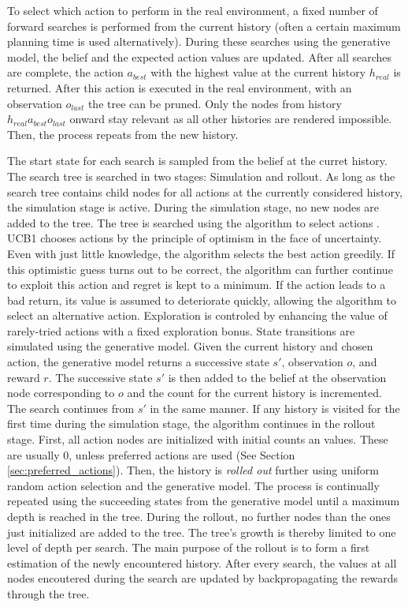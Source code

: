 To select which action to perform in the real environment, a fixed number of forward searches is performed from the current history (often a certain maximum planning time is used alternatively). During these searches using the generative model, the belief and the expected action values are updated. After all searches are complete, the action $a_{best}$ with the highest value at the current history $h_{real}$ is returned. After this action is executed in the real environment, with an observation $o_{last}$ the tree can be pruned. Only the nodes from history $h_{real}a_{best}o_{last}$ onward stay relevant as all other histories are rendered impossible. Then, the process repeats from the new history.

The start state for each search is sampled from the belief at the curret history. The search tree is searched in two stages: Simulation and rollout. As long as the search tree contains child nodes for all actions at the currently considered history, the simulation stage is active. During the simulation stage, no new nodes are added to the tree. The tree is searched using the  algorithm to select actions \parencite{ucb1}. UCB1 chooses actions by the principle of optimism in the face of uncertainty. Even with just little knowledge, the algorithm selects the best action greedily. If this optimistic guess turns out to be correct, the algorithm can further continue to exploit this action and regret is kept to a minimum. If the action leads to a bad return, its value is assumed to deteriorate quickly, allowing the algorithm to select an alternative action. Exploration is controled by enhancing the value of rarely-tried actions with a fixed exploration bonus. State transitions are simulated using the generative model. Given the current history and chosen action, the generative model returns a successive state $s'$, observation $o$, and reward $r$. The successive state $s'$ is then added to the belief at the observation node corresponding to $o$ and the count for the current history is incremented. The search continues from $s'$ in the same manner. If any history is visited for the first time during the simulation stage, the algorithm continues in the rollout stage. First, all action nodes are initialized with initial counts an values. These are usually 0, unless preferred actions are used (See Section \ref{sec:preferred_actions}). Then, the history is \textit{rolled out} further using uniform random action selection and the generative model. The process is continually repeated using the succeeding states from the generative model until a maximum depth is reached in the tree. During the rollout, no further nodes than the ones just initialized are added to the tree. The tree's growth is thereby limited to one level of depth per search. The main purpose of the rollout is to form a first estimation of the newly encountered history. After every search, the values at all nodes encoutered during the search are updated by backpropagating the rewards through the tree.

